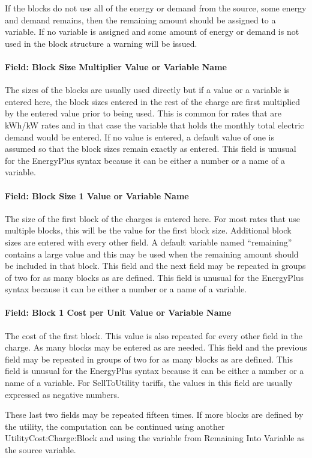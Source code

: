 If the blocks do not use all of the energy or demand from the source, some energy and demand remains, then the remaining amount should be assigned to a variable. If no variable is assigned and some amount of energy or demand is not used in the block structure a warning will be issued.

\paragraph{Field: Block Size Multiplier Value or Variable Name}\label{field-block-size-multiplier-value-or-variable-name}

The sizes of the blocks are usually used directly but if a value or a variable is entered here, the block sizes entered in the rest of the charge are first multiplied by the entered value prior to being used. This is common for rates that are kWh/kW rates and in that case the variable that holds the monthly total electric demand would be entered. If no value is entered, a default value of one is assumed so that the block sizes remain exactly as entered. This field is unusual for the EnergyPlus syntax because it can be either a number or a name of a variable.

\paragraph{Field: Block Size 1 Value or Variable Name}\label{field-block-size-1-value-or-variable-name}

The size of the first block of the charges is entered here. For most rates that use multiple blocks, this will be the value for the first block size. Additional block sizes are entered with every other field. A default variable named ``remaining'' contains a large value and this may be used when the remaining amount should be included in that block. This field and the next field may be repeated in groups of two for as many blocks as are defined. This field is unusual for the EnergyPlus syntax because it can be either a number or a name of a variable.

\paragraph{Field: Block 1 Cost per Unit Value or Variable Name}\label{field-block-1-cost-per-unit-value-or-variable-name}

The cost of the first block. This value is also repeated for every other field in the charge. As many blocks may be entered as are needed. This field and the previous field may be repeated in groups of two for as many blocks as are defined. This field is unusual for the EnergyPlus syntax because it can be either a number or a name of a variable. For SellToUtility tariffs, the values in this field are usually expressed as negative numbers.

These last two fields may be repeated fifteen times. If more blocks are defined by the utility, the computation can be continued using another UtilityCost:Charge:Block and using the variable from Remaining Into Variable as the source variable.

